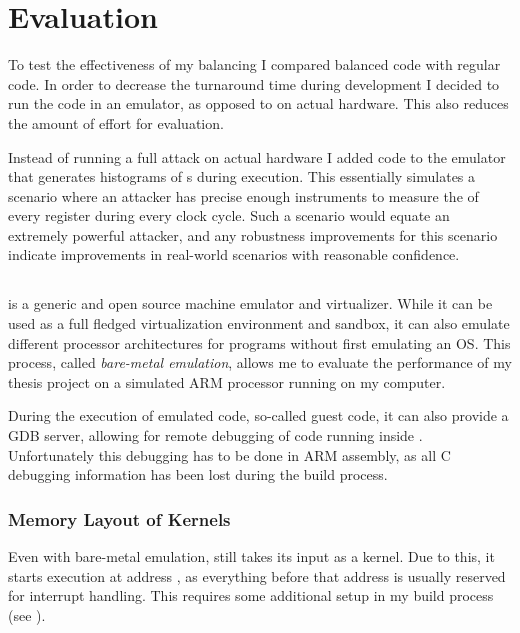 \section{Evaluation}
\label{evaluation}
To test the effectiveness of my balancing I compared balanced code with regular code.
In order to decrease the turnaround time during development I decided to run the code in an emulator, as opposed to on actual hardware.
This also reduces the amount of effort for evaluation.

Instead of running a full \poweranalysis{} attack on actual hardware I added code to the \qemu{} emulator that generates histograms of \hammingw{}s during execution.
This essentially simulates a scenario where an attacker has precise enough instruments to measure the \hammingw{} of every register during every clock cycle.
Such a scenario would equate an extremely powerful attacker, and any robustness improvements for this scenario indicate improvements in real-world scenarios with reasonable confidence.

\subsection{\qemu{}}
\qemu{} is a generic and open source machine emulator and virtualizer.\cite{bellard2005qemu}
While it can be used as a full fledged virtualization environment and sandbox, it can also emulate different processor architectures for programs without first emulating an OS.
This process, called \emph{bare-metal emulation}, allows me to evaluate the performance of my thesis project on a simulated ARM processor running on my computer.

During the execution of emulated code, so-called guest code, it can also provide a GDB server, allowing for remote debugging of code running inside \qemu{}.
Unfortunately this debugging has to be done in ARM assembly, as all C debugging information has been lost during the build process.

\subsubsection{Memory Layout of \qemu{} Kernels}
\label{memory}
Even with bare-metal emulation, \qemu{} still takes its input as a kernel.
Due to this, it starts execution at address , as everything before that address is usually reserved for interrupt handling.
This requires some additional setup in my build process (see ).

